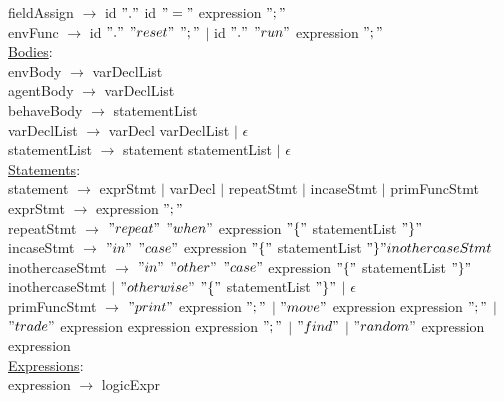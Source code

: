 \documentclass{article}
\begin{document}
fieldAssign $\rightarrow$ id $"."$ id $"="$ expression $";"$ \\

envFunc $\rightarrow$ id $"."$ $"reset"$ $";"$ $\vert$ id $"."$ $"run"$ expression $";"$\\

\underline{Bodies}: \\

envBody $\rightarrow$ varDeclList \\

agentBody $\rightarrow$ varDeclList \\

behaveBody $\rightarrow$ statementList \\

varDeclList $\rightarrow$ varDecl varDeclList $\vert$ $\epsilon$ \\

statementList $\rightarrow$ statement statementList $\vert$ $\epsilon$ \\

\underline{Statements}: \\

statement $\rightarrow$ exprStmt $\vert$ varDecl $\vert$ repeatStmt $\vert$ incaseStmt $\vert$ primFuncStmt \\

exprStmt $\rightarrow$ expression $";"$ \\

repeatStmt $\rightarrow$ $"repeat"$  $"when"$  expression $"\{"$ statementList  $"\}"$ \\

incaseStmt $\rightarrow$  $"in"$  $"case"$ expression $"\{"$ statementList  $"\}" inothercaseStmt$\\

inothercaseStmt $\rightarrow$  $"in"$ $"other"$  $"case"$ expression $"\{"$ statementList  $"\}"$ inothercaseStmt $\vert$ $"otherwise"$ $"\{"$ statementList  $"\}"$ $\vert$ $\epsilon$ \\  

primFuncStmt $\rightarrow$ $"print"$ expression $";"$  $\vert$ $"move"$ expression expression $";"$ $\vert$ $"trade"$ expression expression expression $";"$ $\vert$ $"find"$ $\vert$ $"random"$ expression expression \\

\underline{Expressions}: \\

expression $\rightarrow$ logicExpr \\
\end{document}
